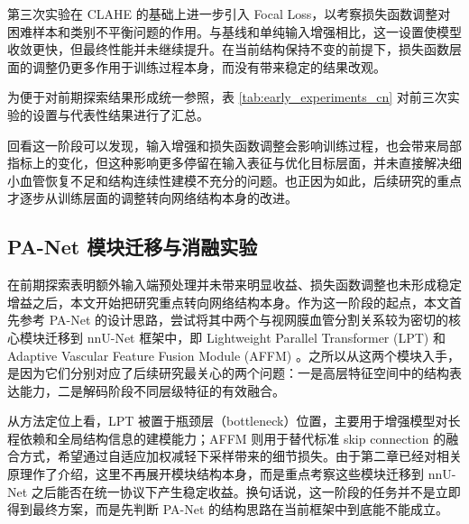 \documentclass[a4paper,12pt]{article}
\begin{document}
第三次实验在 CLAHE 的基础上进一步引入 Focal Loss，以考察损失函数调整对困难样本和类别不平衡问题的作用。与基线和单纯输入增强相比，这一设置使模型收敛更快，但最终性能并未继续提升。在当前结构保持不变的前提下，损失函数层面的调整仍更多作用于训练过程本身，而没有带来稳定的结果改观。

为便于对前期探索结果形成统一参照，表 \ref{tab:early_experiments_cn} 对前三次实验的设置与代表性结果进行了汇总。

\begin{table}[htbp]
\centering
\caption{前期探索实验结果汇总}
\label{tab:early_experiments_cn}
\end{table}

回看这一阶段可以发现，输入增强和损失函数调整会影响训练过程，也会带来局部指标上的变化，但这种影响更多停留在输入表征与优化目标层面，并未直接解决细小血管恢复不足和结构连续性建模不充分的问题。也正因为如此，后续研究的重点才逐步从训练层面的调整转向网络结构本身的改进。

\subsection{PA-Net 模块迁移与消融实验}
在前期探索表明额外输入端预处理并未带来明显收益、损失函数调整也未形成稳定增益之后，本文开始把研究重点转向网络结构本身。作为这一阶段的起点，本文首先参考 PA-Net 的设计思路，尝试将其中两个与视网膜血管分割关系较为密切的核心模块迁移到 nnU-Net 框架中，即 Lightweight Parallel Transformer (LPT) 和 Adaptive Vascular Feature Fusion Module (AFFM) \cite{luo2025panet}。之所以从这两个模块入手，是因为它们分别对应了后续研究最关心的两个问题：一是高层特征空间中的结构表达能力，二是解码阶段不同层级特征的有效融合。

从方法定位上看，LPT 被置于瓶颈层（bottleneck）位置，主要用于增强模型对长程依赖和全局结构信息的建模能力；AFFM 则用于替代标准 skip connection 的融合方式，希望通过自适应加权减轻下采样带来的细节损失。由于第二章已经对相关原理作了介绍，这里不再展开模块结构本身，而是重点考察这些模块迁移到 nnU-Net 之后能否在统一协议下产生稳定收益。换句话说，这一阶段的任务并不是立即得到最终方案，而是先判断 PA-Net 的结构思路在当前框架中到底能不能成立。
\end{document}
